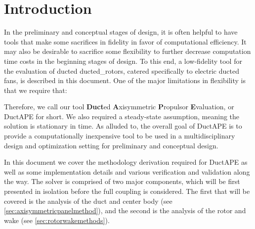 \section{Introduction}
\label{sec:ductintro}

In the preliminary and conceptual stages of design, it is often helpful to have tools that make some sacrifices in fidelity in favor of computational efficiency.
%
It may also be desirable to sacrifice some flexibility to further decrease computation time costs in the beginning stages of design.
%
To this end, a low-fidelity tool for the evaluation of ducted ducted_rotors, catered specifically to electric ducted fans, is described in this document.
%
One of the major limitations in flexibility is that we require that:

\begin{assumption}
    \label{asm:axisymmetric}




\end{assumption}

\noindent Therefore, we call our tool \textbf{Duct}ed \textbf{A}xisymmetric \textbf{P}ropulsor \textbf{E}valuation, or DuctAPE for short.
%
We also required a steady-state assumption, meaning the solution is stationary in time.
%
As alluded to, the overall goal of DuctAPE is to provide a computationally inexpensive tool to be used in a multidisciplinary design and optimization setting for preliminary and conceptual design.

In this document we cover the methodology derivation required for DuctAPE as well as some implementation details and various verification and validation along the way.
%
The solver is comprised of two major components, which will be first presented in isolation before the full coupling is considered.
%
The first that will be covered is the analysis of the duct and center body (see \cref{sec:axisymmetricpanelmethod}), and the second is the analysis of the rotor and wake (see \cref{sec:rotorwakemethods}).

